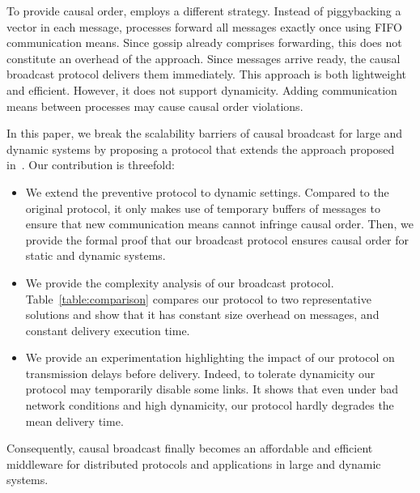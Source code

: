 
To provide causal order, \cite{friedman2004causal} employs a different
strategy. Instead of piggybacking a vector in each message, processes forward
all messages exactly once using FIFO communication means. Since gossip already
comprises forwarding, this does not constitute an overhead of the
approach. Since messages arrive ready, the causal broadcast protocol delivers
them immediately. This approach is both lightweight and efficient. However, it
does not support dynamicity. Adding communication means between processes may
cause causal order violations.


In this paper, we break the scalability barriers of causal broadcast for large
and dynamic systems by proposing a protocol that extends the approach proposed
in~\cite{friedman2004causal}.  Our contribution is threefold:
\begin{itemize}[leftmargin=*]
\item We extend the preventive protocol to dynamic settings. Compared to the
  original protocol, it only makes use of temporary buffers of messages to
  ensure that new communication means cannot infringe causal order.  Then, we
  provide the formal proof that our broadcast protocol ensures causal order for
  static and dynamic systems.
\item We provide the complexity analysis of our broadcast
  protocol. Table~\ref{table:comparison} compares our protocol to two
  representative solutions and show that it has constant size overhead on
  messages, and constant delivery execution time.
\item We provide an experimentation highlighting the impact of our protocol on
  transmission delays before delivery. Indeed, to tolerate dynamicity our
  protocol may temporarily disable some links.  It shows that even under bad
  network conditions and high dynamicity, our protocol hardly degrades the mean
  delivery time.
\end{itemize}
Consequently, causal broadcast finally becomes an affordable and efficient
middleware for distributed protocols and applications in large and dynamic
systems.

